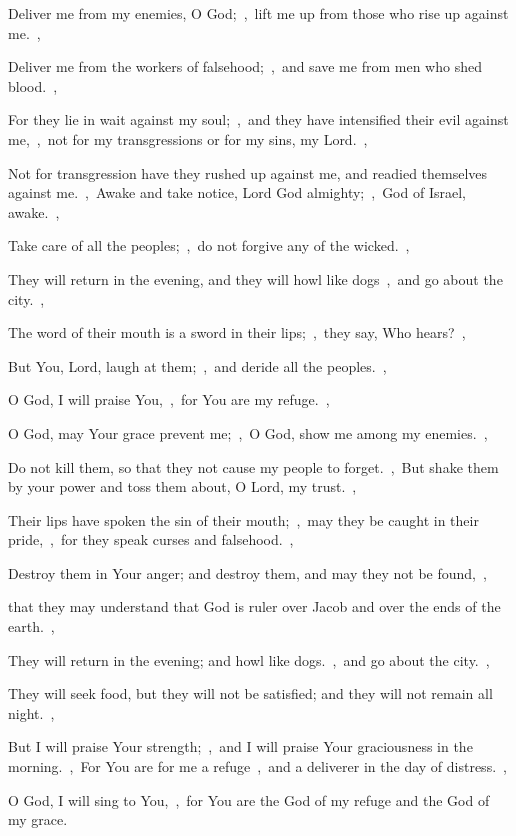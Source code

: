 \documentclass[12pt,twoside,a5paper]{article}
\begin{document}
\begin{normalparskip}
  Deliver me from my enemies, O God;~\sep\ lift me up from those who rise up against me.~\sep


  Deliver me from the workers of falsehood;~\sep\ and save me from men who shed blood.~\sep

  For they lie in wait against my soul;~\sep\ and they have intensified their evil against me,~\sep\ not for my transgressions or for my sins, my Lord.~\sep

  Not for transgression have they rushed up against me, and readied themselves against me.~\sep\ Awake and take notice, Lord God almighty;~\sep\ God of Israel, awake.~\sep

  Take care of all the peoples;~\sep\ do not forgive any of the wicked.~\sep

  They will return in the evening, and they will howl like dogs~\sep\ and go about the city.~\sep

  The word of their mouth is a sword in their lips;~\sep\ they say, Who hears?~\sep

  But You, Lord, laugh at them;~\sep\ and deride all the peoples.~\sep

  O God, I will praise You,~\sep\ for You are my refuge.~\sep

  O God, may Your grace prevent me;~\sep\ O God, show me among my enemies.~\sep

  Do not kill them, so that they not cause my people to forget.~\sep\ But shake them by your power and toss them about, O Lord, my trust.~\sep

  Their lips have spoken the sin of their mouth;~\sep\ may they be caught in their pride,~\sep\ for they speak curses and falsehood.~\sep

  Destroy them in Your anger; and destroy them, and may they not be found,~\sep

  that they may understand that God is ruler over Jacob and over the ends of the earth.~\sep

  They will return in the evening; and howl like dogs.~\sep\ and go about the city.~\sep

  They will seek food, but they will not be satisfied; and they will not remain all night.~\sep

  But I will praise Your strength;~\sep\ and I will praise Your graciousness in the morning.~\sep\ For You are for me a refuge~\sep\ and a deliverer in the day of distress.~\sep

  O God, I will sing to You,~\sep\ for You are the God of my refuge and the God of my grace.
\end{normalparskip}
\end{document}
